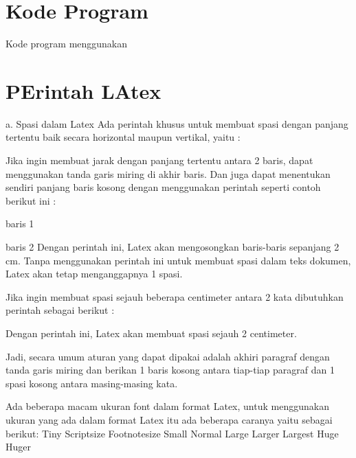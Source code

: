 \section{Kode Program}
Kode program menggunakan 

\section {PErintah LAtex}
a. Spasi dalam Latex
Ada perintah khusus untuk membuat spasi dengan panjang tertentu baik secara horizontal maupun vertikal, yaitu :

Jika ingin membuat jarak dengan panjang tertentu antara 2 baris, dapat menggunakan tanda garis miring di akhir baris. Dan juga dapat menentukan sendiri panjang baris kosong dengan menggunakan perintah seperti contoh berikut ini :

baris 1



baris 2 
Dengan perintah ini, Latex akan mengosongkan baris-baris sepanjang 2 cm. Tanpa menggunakan perintah ini untuk membuat spasi dalam teks dokumen, Latex akan tetap menganggapnya 1 spasi.

Jika ingin membuat spasi sejauh beberapa centimeter antara 2 kata dibutuhkan perintah sebagai berikut :

Dengan perintah ini, Latex akan membuat spasi sejauh 2 centimeter.

Jadi, secara umum aturan yang dapat dipakai adalah akhiri paragraf dengan tanda garis miring dan berikan 1 baris kosong antara tiap-tiap paragraf dan 1 spasi kosong antara masing-masing kata.

Ada beberapa macam ukuran font dalam format Latex, untuk menggunakan ukuran yang ada dalam format Latex itu ada beberapa caranya yaitu sebagai berikut:
Tiny
Scriptsize
Footnotesize
Small
Normal
Large
Larger
Largest
Huge
Huger
